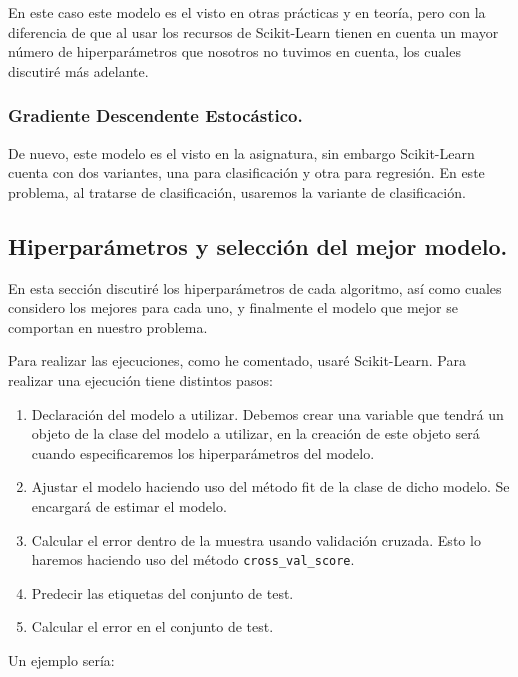 \documentclass[12pt, spanish]{article}
\begin{document}
En este caso este modelo es el visto en otras prácticas y en teoría, pero con la diferencia de que al usar los recursos de Scikit-Learn\cite{sourceLogistic} tienen en cuenta un mayor número de hiperparámetros que nosotros no tuvimos en cuenta, los cuales discutiré más adelante.

\subsubsection{Gradiente Descendente Estocástico.}

De nuevo, este modelo es el visto en la asignatura, sin embargo Scikit-Learn cuenta con dos variantes, una para clasificación y otra para regresión. En este problema, al tratarse de clasificación, usaremos la variante de clasificación\cite{sourceSGDClas}.


\newpage

\subsection{Hiperparámetros y selección del mejor modelo.}

En esta sección discutiré los hiperparámetros de cada algoritmo, así como cuales considero los mejores para cada uno, y finalmente el modelo que mejor se comportan en nuestro problema.

Para realizar las ejecuciones, como he comentado, usaré Scikit-Learn. Para realizar una ejecución tiene distintos pasos:

\begin{enumerate}
	\item Declaración del modelo a utilizar. Debemos crear una variable que tendrá un objeto de la clase del modelo a utilizar, en la creación de este objeto será cuando especificaremos los hiperparámetros del modelo.
	\item Ajustar el modelo haciendo uso del método fit de la clase de dicho modelo. Se encargará de estimar el modelo.
	\item Calcular el error dentro de la muestra usando validación cruzada. Esto lo haremos haciendo uso del método \texttt{cross\_val\_score}.
	\item Predecir las etiquetas del conjunto de test.
	\item Calcular el error en el conjunto de test.
\end{enumerate}

Un ejemplo sería:
\end{document}

